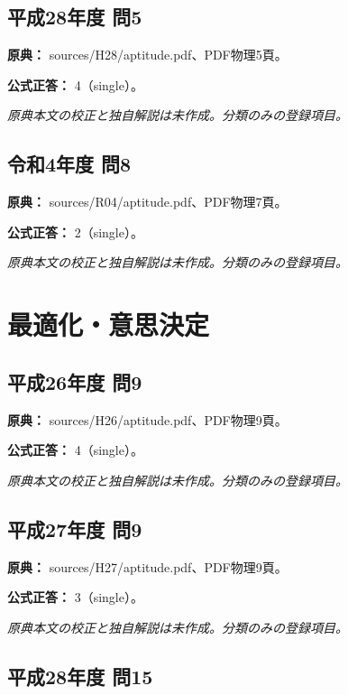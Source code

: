 \subsection{平成28年度 問5}
\label{q:h28-reg-apt-05}

\noindent\textbf{原典：} sources/H28/aptitude.pdf、PDF物理5頁。

\textbf{公式正答：} 4（single）。

\par\textit{原典本文の校正と独自解説は未作成。分類のみの登録項目。}

\subsection{令和4年度 問8}
\label{q:r04-reg-apt-08}

\noindent\textbf{原典：} sources/R04/aptitude.pdf、PDF物理7頁。

\textbf{公式正答：} 2（single）。

\par\textit{原典本文の校正と独自解説は未作成。分類のみの登録項目。}

\section{最適化・意思決定}

\subsection{平成26年度 問9}
\label{q:h26-reg-apt-09}

\noindent\textbf{原典：} sources/H26/aptitude.pdf、PDF物理9頁。

\textbf{公式正答：} 4（single）。

\par\textit{原典本文の校正と独自解説は未作成。分類のみの登録項目。}

\subsection{平成27年度 問9}
\label{q:h27-reg-apt-09}

\noindent\textbf{原典：} sources/H27/aptitude.pdf、PDF物理9頁。

\textbf{公式正答：} 3（single）。

\par\textit{原典本文の校正と独自解説は未作成。分類のみの登録項目。}

\subsection{平成28年度 問15}
\label{q:h28-reg-apt-15}

